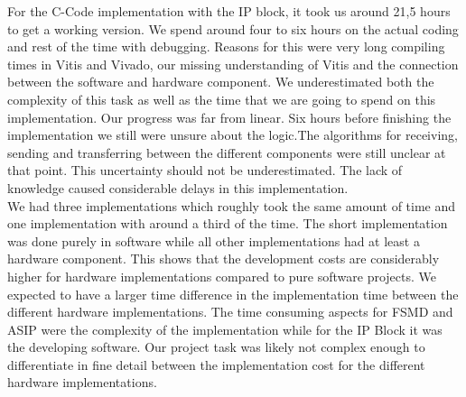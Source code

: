 \documentclass[conference]{IEEEtran}
\begin{document}
For the C-Code implementation with the IP block, it took us around 21,5 hours to get a working version. We spend around four to six hours on the actual coding and rest of the time with debugging. Reasons for this were very long compiling times in Vitis and Vivado, our missing understanding of Vitis and the connection between the software and hardware component. We underestimated both the complexity of this task as well as the time that we are going to spend on this implementation. Our progress was far from linear. Six hours before finishing the implementation we still were unsure about the logic.The algorithms for receiving, sending and transferring between the different components were still unclear at that point. This uncertainty should not be underestimated. The lack of knowledge caused considerable delays in this implementation. \\
We had three implementations which roughly took the same amount of time and one implementation with around a third of the time. The short implementation was done purely in software while all other implementations had at least a hardware component. This shows that the development costs are considerably higher for hardware implementations compared to pure software projects. We expected to have a larger time difference in the implementation time between the different hardware implementations. The time consuming aspects for FSMD and ASIP were the complexity of the implementation while for the IP Block it was the developing software. Our project task was likely not complex enough to differentiate in fine detail between the implementation cost for the different hardware implementations.\\
\end{document}
